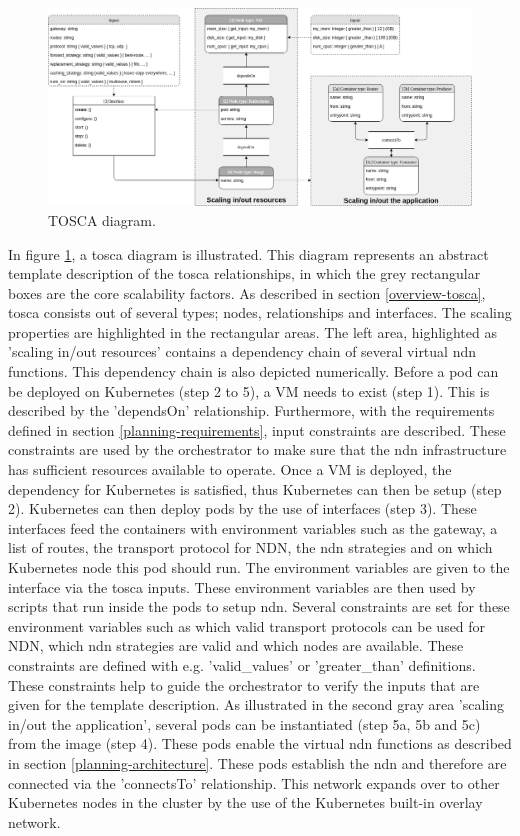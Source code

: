 \begin{figure}[H]
\centering
\includegraphics[width=\columnwidth]{Images/tosca-diagram.png}
\caption{TOSCA diagram.}
\label{fig:tosca-diagram}
\end{figure}

In figure \ref{fig:tosca-diagram}, a \gls{tosca} diagram is illustrated. This diagram represents an abstract template description of the \gls{tosca} relationships, in which the grey rectangular boxes are the core scalability factors. As described in section \ref{overview-tosca}, \gls{tosca} consists out of several types; nodes, relationships and interfaces. The scaling properties are highlighted in the rectangular areas. The left area, highlighted as 'scaling in/out resources' contains a dependency chain of several virtual \gls{ndn} functions. This dependency chain is also depicted numerically. Before a pod can be deployed on Kubernetes (step 2 to 5), a VM needs to exist (step 1). This is described by the 'dependsOn' relationship. Furthermore, with the requirements defined in section \ref{planning-requirements}, input constraints are described. These constraints are used by the orchestrator to make sure that the \gls{ndn} infrastructure has sufficient resources available to operate. Once a VM is deployed, the dependency for Kubernetes is satisfied, thus Kubernetes can then be setup (step 2). Kubernetes can then deploy pods by the use of interfaces (step 3). These interfaces feed the containers with environment variables such as the gateway, a list of routes, the transport protocol for NDN, the \gls{ndn} strategies and on which Kubernetes node this pod should run. The environment variables are given to the interface via the \gls{tosca} inputs. These environment variables are then used by scripts that run inside the pods to setup \gls{ndn}. Several constraints are set for these environment variables such as which valid transport protocols can be used for NDN, which \gls{ndn} strategies are valid and which nodes are available. These constraints are defined with e.g. 'valid\_values' or 'greater\_than' definitions. These constraints help to guide the orchestrator to verify the inputs that are given for the template description. As illustrated in the second gray area 'scaling in/out the application', several pods can be instantiated (step 5a, 5b and 5c) from the image (step 4). These pods enable the virtual \gls{ndn} functions as described in section \ref{planning-architecture}. These pods establish the \gls{ndn} and therefore are connected via the 'connectsTo' relationship. This network expands over to other Kubernetes nodes in the cluster by the use of the Kubernetes built-in overlay network.

